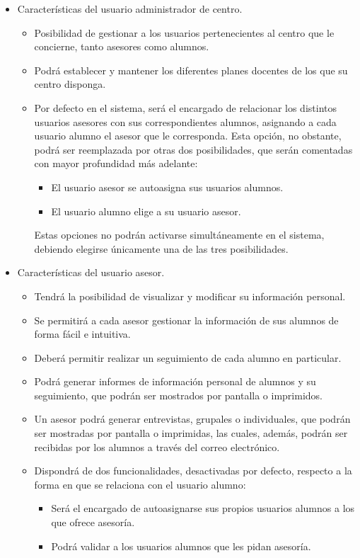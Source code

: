 \begin{itemize}
   \item Características del usuario administrador de centro.
      \begin{itemize}
       \item Posibilidad de gestionar a los usuarios pertenecientes al centro
             que le concierne, tanto asesores como alumnos.
       \item Podrá establecer y mantener los diferentes planes docentes de los
             que su centro disponga.
       \item Por defecto en el sistema, será el encargado de relacionar los
             distintos usuarios asesores con sus correspondientes alumnos,
             asignando a cada usuario alumno el asesor que le corresponda. Esta
             opción, no obstante, podrá ser reemplazada por otras dos
             posibilidades, que serán comentadas con mayor profundidad más
             adelante:
             \begin{itemize}
               \item El usuario asesor se autoasigna sus usuarios alumnos.
               \item El usuario alumno elige a su usuario asesor.
             \end{itemize}
             Estas opciones no podrán activarse simultáneamente en el sistema,
             debiendo elegirse únicamente una de las tres posibilidades.
      \end{itemize}

   \item Características del usuario asesor.
      \begin{itemize}
         \item Tendrá la posibilidad de visualizar y modificar su información
         personal.
         \item Se permitirá a cada asesor gestionar la información de sus
         alumnos de forma fácil e intuitiva.
         \item Deberá permitir realizar un seguimiento de cada alumno en
         particular.
         \item Podrá generar informes de información personal de alumnos y su
         seguimiento, que podrán ser mostrados por pantalla o imprimidos.
         \item Un asesor podrá generar entrevistas, grupales o individuales, que
         podrán ser mostradas por pantalla o imprimidas, las cuales, además,
         podrán ser recibidas por los alumnos a través del correo electrónico.
         \item Dispondrá de dos funcionalidades, desactivadas por defecto,
         respecto a la forma en que se relaciona con el usuario alumno:
         \begin{itemize}
            \item Será el encargado de autoasignarse sus propios usuarios
            alumnos a los que ofrece asesoría.
            \item Podrá validar a los usuarios alumnos que les pidan asesoría.
         \end{itemize}
      \end{itemize}


\end{itemize}
